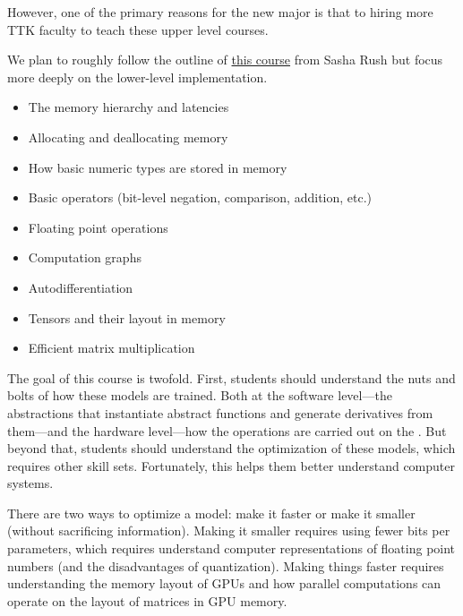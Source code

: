 However, one of the primary reasons for the new major is that to hiring more TTK faculty to teach these upper level courses.



We plan to roughly follow the outline of \href{https://minitorch.github.io/}{this course} from Sasha Rush but focus more deeply on the lower-level implementation.

\begin{itemize}
    \item The memory hierarchy and latencies 
    \item Allocating and deallocating memory
    \item How basic numeric types are stored in memory
    \item Basic operators (bit-level negation, comparison, addition, etc.)
    \item Floating point operations
    \item Computation graphs
    \item Autodifferentiation
    \item Tensors and their layout in memory
    \item Efficient matrix multiplication
\end{itemize}


The goal of this course is twofold.  First, students should understand the nuts and bolts of how these models are trained.  Both at the software level---the abstractions that instantiate abstract functions and generate derivatives from them---and the hardware level---how the operations are carried out on the .  But beyond that, students should understand the optimization of these models, which requires other skill sets.  Fortunately, this helps them better understand computer systems.

There are two ways to optimize a model: make it faster or make it smaller (without sacrificing information).  Making it smaller requires using fewer bits per parameters, which requires understand computer representations of floating point numbers (and the disadvantages of quantization).  Making things faster requires understanding the memory layout of GPUs and how parallel computations can operate on the layout of matrices in GPU memory.


